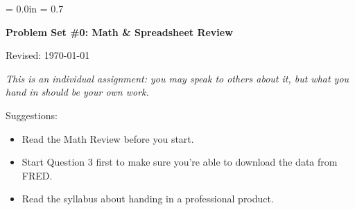 \documentclass[12pt]{exam}
\def\HeadName{Problem Set \#0}
\begin{document}
\parindent = 0.0in
\parskip = 0.7\bigskipamount
\thispagestyle{empty}%
\Head

\centerline{\large \bf \HeadName: Math \& Spreadsheet Review}
\centerline{Revised:  \today}

\medskip
{\it This is an individual assignment:  you may speak to others about it,
but what you hand in should be your own work.

Suggestions:
\begin{itemize} \itemsep=0pt
\item Read the Math Review before you start.
\item Start Question 3 first to make sure you're able to download the data from FRED.
\item Read the syllabus about handing in a professional product.
\end{itemize}
}
\end{document}
